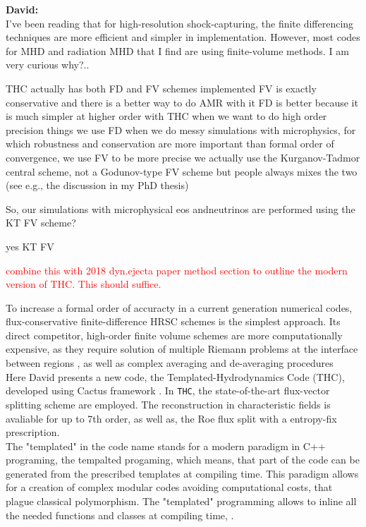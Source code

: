 \documentclass[11pt,a4paper,headinclude=true,DIV=14,BCOR=8mm,chapterprefix,listof=totoc,twoside,openright,abstracton]{scrbook}
\begin{document}
\begin{sidenote}
    \textbf{David:}  \\
    
    I've been reading that for high-resolution shock-capturing, the finite differencing techniques are more efficient and simpler in implementation. However, most codes for MHD and radiation MHD that I find are using finite-volume methods. I am very curious why?..
    
    THC actually has both FD and FV schemes implemented
    FV is exactly conservative and there is a better way to do AMR with it
    FD is better because it is much simpler at higher order
    with THC when we want to do high order precision things we use FD
    when we do messy simulations with microphysics, for which robustness and conservation are more important than formal order of convergence, we use FV
    to be more precise we actually use the Kurganov-Tadmor central scheme, not a Godunov-type FV scheme
    but people always mixes the two (see e.g., the discussion in my PhD thesis)
    
    So, our simulations with microphysical eos andneutrinos are performed using the KT FV scheme?
    
    yes KT FV
\end{sidenote}
\textcolor{red}{combine this with 2018 dyn.ejecta paper method section to outline the modern version of THC. This should suffice.}

To increase a formal order of accuracty in a current generation numerical codes,  flux-conservative finite-difference HRSC schemes is the simplest approach. Its direct competitor, high-order finite volume schemes are more computationally expensive, as they require solution of multiple Riemann problems at the interface between regions \cite{Reisswig:2009us,Shu:2001rep}, as well as complex averaging and de-averaging procedures \cite{Tchekhovskoy:2007zn} \\

Here David presents a new code, the Templated-Hydrodynamics Code (THC), developed using Cactus framework \cite{Goodale:2003}. In \texttt{THC}, the state-of-the-art flux-vector splitting scheme are employed. The reconstruction in characteristic fields is avaliable for up to 7th order, as well as, the Roe flux split with a entropy-fix prescription. \\

The "templated" in the code name stands for a modern paradigm in C++ programing, the tempalted progaming, which means, that part of the code can be generated from the prescribed templates at compiling time. This paradigm allows for a creation of complex modular codes avoiding computational costs, that plague classical polymorphism. The "templated" programming allows to inline all the needed functions and classes at compiling time, \cite{Yang:2001}. \\
\end{document}
